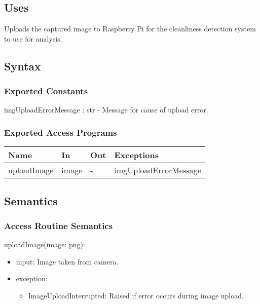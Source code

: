 \documentclass[12pt, titlepage]{article}
\begin{document}
\subsection{Uses}
Uploads the captured image to Raspberry Pi for the cleanliness detection system to use for analysis.

\subsection{Syntax}

\subsubsection{Exported Constants}
imgUploadErrorMessage : str - Message for cause of upload error.

\subsubsection{Exported Access Programs}

\begin{center}
\begin{tabular}{p{3cm} p{2cm} p{2cm} p{5cm}}
\hline
\textbf{Name} & \textbf{In} & \textbf{Out} & \textbf{Exceptions} \\
\hline
uploadImage & image & - & imgUploadErrorMessage \\
\hline
\end{tabular}
\end{center}

\subsection{Semantics}


\subsubsection{Access Routine Semantics}

\noindent uploadImage(image: png):
\begin{itemize}
\item input: Image taken from camera. 
\item exception: 
	\begin{itemize}
		\item ImageUploadInterrupted: Raised if error occurs during image upload.
	\end{itemize} 
\end{itemize}
\end{document}
